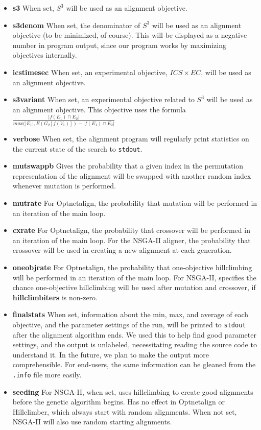 \documentclass[11pt]{article} %
\begin{document}
\begin{itemize}
\item \textbf{s3} When set, \(S^3\) will be used as an alignment objective.
\item \textbf{s3denom} When set, the denominator of \(S^3\) will be used as an alignment objective (to be minimized, of course). This will be displayed as a negative number in program output, since our program works by maximizing objectives internally.
\item \textbf{icstimesec} When set, an experimental objective, \(ICS \times EC\), will be used as an alignment objective.
\item \textbf{s3variant} When set, an experimental objective related to \(S^3\) will be used as an alignment objective. This objective uses the formula \(\frac{|f(E_1) \cap E_2|}{max(|E_1|, E(G_2[f(V_1)]) - |f(E_1) \cap E_2|}\)
\item \textbf{verbose} When set, the alignment program will regularly print statistics on the current state of the search to \texttt{stdout}.
\item \textbf{mutswappb} Gives the probability that a given index in the permutation representation of the alignment will be swapped with another random index whenever mutation is performed.
\item \textbf{mutrate} For Optnetalign, the probability that mutation will be performed in an iteration of the main loop.
\item \textbf{cxrate} For Optnetalign, the probability that crossover will be performed in an iteration of the main loop. For the NSGA-II aligner, the probability that crossover will be used in creating a new alignment at each generation.
\item \textbf{oneobjrate} For Optnetalign, the probability that one-objective hillclimbing will be performed in an iteration of the main loop. For NSGA-II, specifies the chance one-objective hillclimbing will be used after mutation and crossover, if \textbf{hillclimbiters} is non-zero.
\item \textbf{finalstats} When set, information about the min, max, and average of each objective, and the parameter settings of the run, will be printed to \texttt{stdout} after the alignment algorithm ends. We used this to help find good parameter settings, and the output is unlabeled, necessitating reading the source code to understand it. In the future, we plan to make the output more comprehensible. For end-users, the same information can be gleaned from the \texttt{.info} file more easily.
\item \textbf{seeding} For NSGA-II, when set, uses hillclimbing to create good alignments before the genetic algorithm begins. Has no effect in Optnetalign or Hillclimber, which always start with random alignments. When not set, NSGA-II will also use random starting alignments.

\end{itemize}
\end{document}
